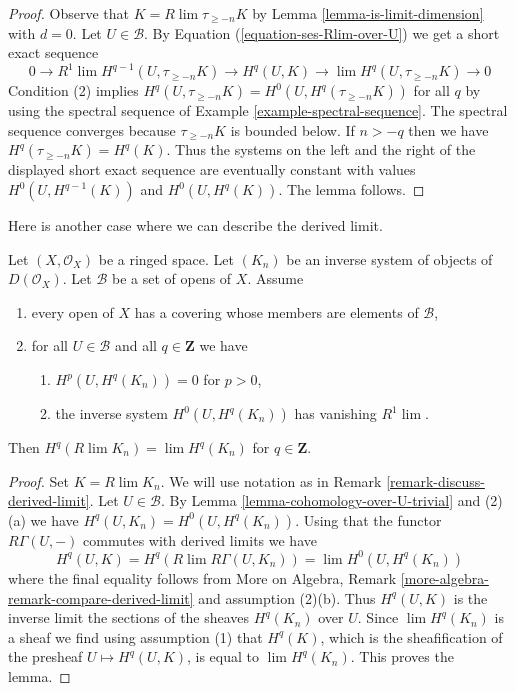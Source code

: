 \begin{proof}
Observe that $K = R\lim \tau_{\geq -n} K$ by
Lemma \ref{lemma-is-limit-dimension} with $d = 0$.
Let $U \in \mathcal{B}$. By Equation (\ref{equation-ses-Rlim-over-U})
we get a short exact sequence
$$
0 \to R^1\lim H^{q - 1}(U, \tau_{\geq -n}K) \to
H^q(U, K) \to \lim H^q(U, \tau_{\geq -n}K) \to 0
$$
Condition (2) implies
$H^q(U, \tau_{\geq -n} K) = H^0(U, H^q(\tau_{\geq -n} K))$
for all $q$ by using the spectral sequence of
Example \ref{example-spectral-sequence}.
The spectral sequence converges because $\tau_{\geq -n}K$ is bounded
below. If $n > -q$ then we have $H^q(\tau_{\geq -n}K) = H^q(K)$.
Thus the systems on the left and the right of the displayed
short exact sequence are eventually constant with values
$H^0(U, H^{q - 1}(K))$ and $H^0(U, H^q(K))$. The lemma follows.
\end{proof}

\noindent
Here is another case where we can describe the derived limit.

\begin{lemma}
\label{lemma-derived-limit-suitable-system}
Let $(X, \mathcal{O}_X)$ be a ringed space. Let $(K_n)$
be an inverse system of objects of $D(\mathcal{O}_X)$.
Let $\mathcal{B}$ be a set of opens of $X$. Assume
\begin{enumerate}
\item every open of $X$ has a covering whose members are
elements of $\mathcal{B}$,
\item for all $U \in \mathcal{B}$ and all $q \in \mathbf{Z}$ we have
\begin{enumerate}
\item $H^p(U, H^q(K_n)) = 0$ for $p > 0$,
\item the inverse system $H^0(U, H^q(K_n))$ has vanishing $R^1\lim$.
\end{enumerate}
\end{enumerate}
Then $H^q(R\lim K_n) = \lim H^q(K_n)$ for $q \in \mathbf{Z}$.
\end{lemma}

\begin{proof}
Set $K = R\lim K_n$. We will use notation as in
Remark \ref{remark-discuss-derived-limit}. Let $U \in \mathcal{B}$.
By Lemma \ref{lemma-cohomology-over-U-trivial} and (2)(a)
we have $H^q(U, K_n) = H^0(U, H^q(K_n))$.
Using that the functor $R\Gamma(U, -)$ commutes with
derived limits we have
$$
H^q(U, K) = H^q(R\lim R\Gamma(U, K_n)) = \lim H^0(U, H^q(K_n))
$$
where the final equality follows from
More on Algebra, Remark \ref{more-algebra-remark-compare-derived-limit}
and assumption (2)(b). Thus $H^q(U, K)$ is the inverse limit
the sections of the sheaves $H^q(K_n)$ over $U$. Since
$\lim H^q(K_n)$ is a sheaf we find using assumption (1) that $H^q(K)$,
which is the sheafification of the presheaf $U \mapsto H^q(U, K)$,
is equal to $\lim H^q(K_n)$. This proves the lemma.
\end{proof}








